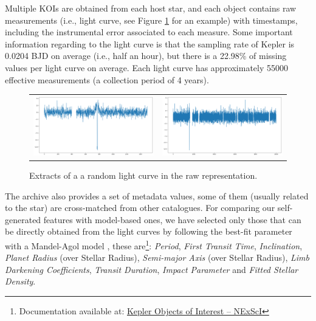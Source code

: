 Multiple KOIs are obtained from each host star, and each object contains raw measurements (i.e., light curve, see Figure \ref{fig:curva_muestreo} for an example) with timestamps, including the instrumental error associated to each measure. 
Some important information regarding to the light curve is that the sampling rate of Kepler is 0.0204 BJD on average (i.e., half an hour), but there is a 22.98\% of missing values per light curve on average. Each light curve has approximately 55000 effective measurements (a collection period of 4 years).

\begin{figure}[t]
    \centering
    \begin{tabular}{cc}
    \includegraphics[width=0.45\linewidth]{imgs/curva1.png} &\includegraphics[width=0.45\linewidth]{imgs/curva2.png}  \\
    \end{tabular}
    \caption{Extracts of a a random light curve in the raw representation.}
    \label{fig:curva_muestreo}
\end{figure}

The archive also provides a set of metadata values, some of them (usually related to the star) are cross-matched from other catalogues. For comparing our self-generated features with model-based ones, we have selected only those that can be directly obtained from the light curves by following the best-fit parameter with a Mandel-Agol model \citep{mandel2002analytic}, these are\footnote{Documentation available at: \href{https://exoplanetarchive.ipac.caltech.edu/docs/API\_kepcandidate\_columns.html}{Kepler Objects of Interest -- NExScI}}: \textit{Period}, \textit{First Transit Time}, \textit{Inclination}, \textit{Planet Radius} (over Stellar Radius), \textit{Semi-major Axis} (over Stellar Radius), \textit{Limb Darkening Coefficients}, \textit{Transit Duration}, \textit{Impact Parameter} and \textit{Fitted Stellar Density}.

